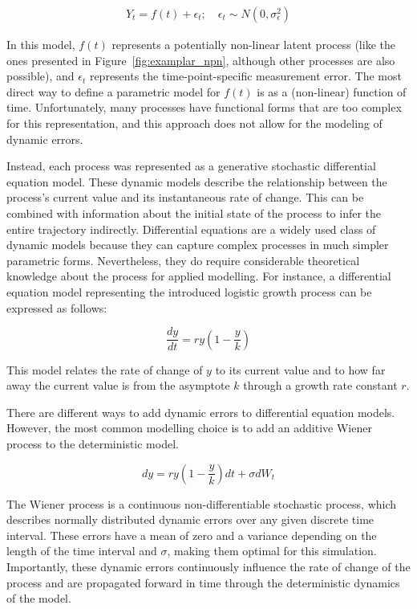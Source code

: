\documentclass[man, floatsintext]{apa7}
\begin{document}
\begin{align}
  Y_t = f(t) + \epsilon_t; \quad \epsilon_t \sim N(0, \sigma^2_{\epsilon})
\end{align}

\noindent In this model, $f(t)$ represents a potentially non-linear latent
process (like the ones presented in Figure~\ref{fig:examplar_npn}, although
other processes are also possible), and $\epsilon_t$ represents the
time-point-specific measurement error. The most direct way to define a
parametric model for $f(t)$ is as a (non-linear) function of time.
Unfortunately, many processes have functional forms that are too complex for
this representation, and this approach does not allow for the modeling of
dynamic errors.

Instead, each process was represented as a generative stochastic differential
equation model. These dynamic models describe the relationship between the
process's current value and its instantaneous rate of change. This can be
combined with information about the initial state of the process to infer the
entire trajectory indirectly. Differential equations are a widely used class of
dynamic models because they can capture complex processes in much simpler
parametric forms. Nevertheless, they do require considerable theoretical
knowledge about the process for applied modelling. For instance, a differential
equation model representing the introduced logistic growth process can be
expressed as follows:

\begin{equation} \label{eq:2}
  \frac{dy}{dt} = r y (1-\frac{y}{k})
\end{equation}

\noindent This model relates the rate of change of $y$ to its current value and
to how far away the current value is from the asymptote $k$ through a growth
rate constant $r$.

There are different ways to add dynamic errors to differential equation models.
However, the most common modelling choice is to add an additive Wiener process
to the deterministic model.

\begin{equation}
  dy = r y (1-\frac{y}{k})dt + \sigma dW_t
\end{equation}

\noindent The Wiener process is a continuous non-differentiable stochastic
process, which describes normally distributed dynamic errors over any given
discrete time interval. These errors have a mean of zero and a variance
depending on the length of the time interval and $\sigma$, making them optimal
for this simulation. Importantly, these dynamic errors continuously influence
the rate of change of the process and are propagated forward in time through
the deterministic dynamics of the model.
\end{document}
